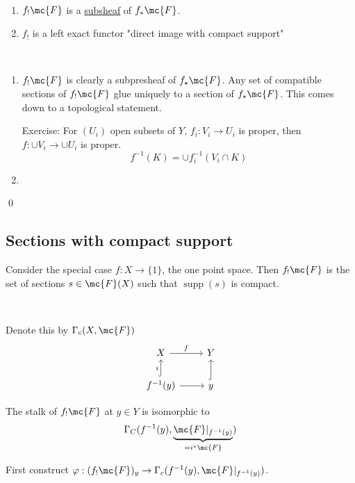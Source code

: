 \documentclass[x11names,reqno,14pt]{extarticle}
\DeclareMathOperator{\supp}{supp}
\begin{document}
\thm\,

\begin{enumerate}[label=(\alph*)]

\item $f_!\mc{F}$ is a \underline{subsheaf} of $f_*\mc{F}$. 

\item $f_!$ is a left exact functor "direct image with compact support"

\end{enumerate}

\proof\,

\begin{enumerate}[label=(\alph*)]

\item $f_!\mc{F}$ is clearly a subpresheaf of $f_\star\mc{F}$. Any set of compatible sections of $f_!\mc{F}$ glue uniquely to a section of $f_\star\mc{F}$. This comes down to a topological statement. 

Exercise: For $(U_i)$ open subsets of $Y$, $f_i:V_i\to U_i$ is proper, then $f: \cup V_i \to \cup U_i$ is proper. 
\[
f^{-1}(K) = \cup f_i^{-1}(V_i \cap K)
\]

\item 

\end{enumerate}

\qed

\subsection*{Sections with compact support}

Consider the special case $f:X\to\{1\}$, the one point space. Then $f_!\mc{F}$ is the set of sections $s \in \mc{F}(X)$ such that $\supp(s)$ is compact. 

\,

Denote this by $\Gamma_c(X, \mc{F})$
\[
\begin{tikzcd}
X \ar[r, "f"] & Y \\
f^{-1}(y) \ar[u, "i", hook] \ar[r] & y \ar[u, hook]
\end{tikzcd}
\]

\prop

The stalk of $f_!\mc{F}$ at $y \in Y$ is isomorphic to 
\[
\Gamma_C(f^{-1}(y), \underbrace{\mc{F}|_{f^{-1}(y)}}_{=i^\star\mc{F}})
\]

\proof

First construct $\varphi:(f_!\mc{F})_y \to \Gamma_c(f^{-1}(y), \mc{F}|_{f^{-1}(y)})$.
\end{document}
